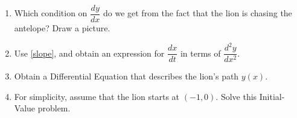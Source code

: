 \begin{enumerate}[label=\emph{\arabic*.}]
\item \label{slope} Which condition on $\dfrac{dy}{dx}$ do we get from the fact that the lion is chasing the antelope? Draw a picture.


\item Use \ref{slope}, and obtain an expression for $\dfrac{dx}{dt}$ in terms of $\dfrac{d^2y}{dx^2}$. 
%    


\item Obtain a Differential Equation that describes the lion's path $y(x)$.


\item For simplicity, assume that the lion starts at $(-1,0)$. Solve this Initial-Value problem. 


\end{enumerate}
